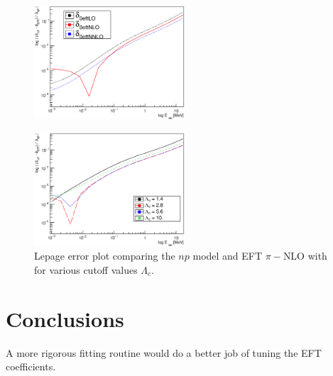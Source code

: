 \documentclass[10pt,showpacs,preprintnumbers,footinbib,amsmath,amssymb,aps,prl,twocolumn,groupedaddress,superscriptaddress,showkeys]{revtex4-1}
\begin{document}
\begin{figure}
\centering
	\includegraphics[width=0.5\textwidth]{figures/phy989_OnePionLepage.eps}
	\caption{}
	\label{fig:OnePionLepage}
\end{figure}

\begin{figure}
\centering
	\includegraphics[width=0.5\textwidth]{figures/phy989_OnePionCutoff.eps}
	\caption{Lepage error plot comparing the $np$ model and EFT $\pi-$NLO with
	for various cutoff values $\Lambda_c$.}
	\label{fig:OnePionCutoff}
\end{figure}


\section{Conclusions}

A more rigorous fitting routine would do a better job of tuning the EFT coefficients.





\end{document}
